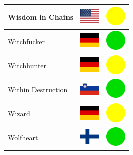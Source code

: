 \documentclass[12pt, a4paper, twoside]{report}
\begin{document}
\begin{center}
\begin{longtable}{|p{5cm}|p{2cm}|p{2cm}|}
			Wisdom in Chains & \includegraphics[width=1cm]{4x3/us} & \includegraphics[width=1cm]{likes/m} \\ \hline
			Witchfucker & \includegraphics[width=1cm]{4x3/de} & \includegraphics[width=1cm]{likes/y} \\ \hline
			Witchhunter & \includegraphics[width=1cm]{4x3/de} & \includegraphics[width=1cm]{likes/m} \\ \hline
			Within Destruction & \includegraphics[width=1cm]{4x3/si} & \includegraphics[width=1cm]{likes/y} \\ \hline
			Wizard & \includegraphics[width=1cm]{4x3/de} & \includegraphics[width=1cm]{likes/m} \\ \hline
			Wolfheart & \includegraphics[width=1cm]{4x3/fi} & \includegraphics[width=1cm]{likes/y} \\ \hline

\end{longtable}
\end{center}
\end{document}
